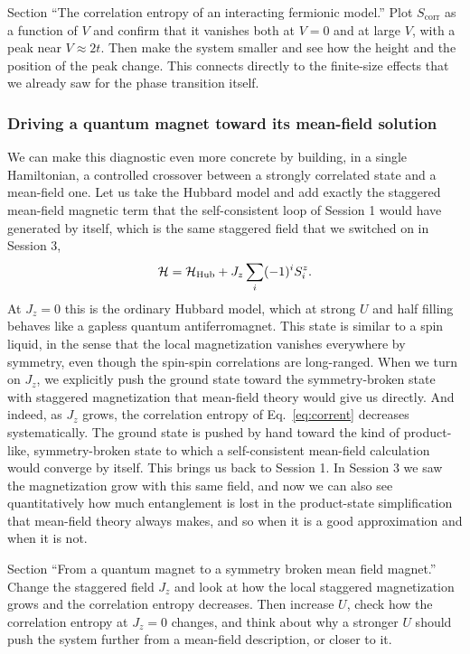 \documentclass[lecture_notes.tex]{subfiles}
\begin{document}
\begin{notebook}
Section ``The correlation entropy of an interacting fermionic model.'' Plot $S_{\mathrm{corr}}$
as a function of $V$ and confirm that it vanishes both at $V=0$ and at large $V$, with a peak near
$V\approx2t$. Then make the system smaller and see how the height and the position of the peak
change. This connects directly to the finite-size effects that we already saw for the phase
transition itself.
\end{notebook}

\subsubsection{Driving a quantum magnet toward its mean-field solution}
We can make this diagnostic even more concrete by building, in a single Hamiltonian, a controlled
crossover between a strongly correlated state and a mean-field one. Let us take the Hubbard model
and add exactly the staggered mean-field magnetic term that the self-consistent loop of Session 1
would have generated by itself, which is the same staggered field that we switched on in Session 3,
\begin{equation}
  \mathcal{H} = \mathcal{H}_{\mathrm{Hub}} + J_z\sum_i (-1)^i S_i^z.
\end{equation}
At $J_z=0$ this is the ordinary Hubbard model, which at strong $U$ and half filling behaves like a
gapless quantum antiferromagnet. This state is similar to a spin liquid, in the sense that the
local magnetization vanishes everywhere by symmetry, even though the spin-spin correlations are
long-ranged. When we turn on $J_z$, we explicitly push the ground state toward the symmetry-broken
state with staggered magnetization that mean-field theory would give us directly. And indeed, as
$J_z$ grows, the correlation entropy of Eq.~\eqref{eq:corrent} decreases systematically. The ground
state is pushed by hand toward the kind of product-like, symmetry-broken state to which a
self-consistent mean-field calculation would converge by itself. This brings us back to Session 1.
In Session 3 we saw the magnetization grow with this same field, and now we can also see
quantitatively how much entanglement is lost in the product-state simplification that mean-field
theory always makes, and so when it is a good approximation and when it is not.

\begin{notebook}
Section ``From a quantum magnet to a symmetry broken mean field magnet.'' Change the staggered field
$J_z$ and look at how the local staggered magnetization grows and the correlation entropy decreases.
Then increase $U$, check how the correlation entropy at $J_z=0$ changes, and think about why a
stronger $U$ should push the system further from a mean-field description, or closer to it.
\end{notebook}
\end{document}
